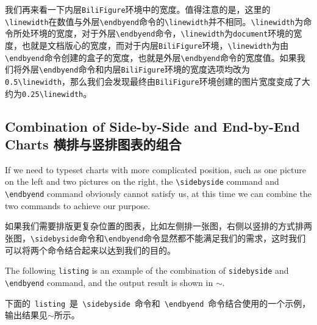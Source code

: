 \begin{ParaColumn}
    \switchcolumn

    我们再来看一下内层\verb"BiliFigure"环境中的宽度。值得注意的是，这里的\verb"\linewidth"在数值与外层\verb"\endbyend"命令的\verb"\linewidth"并不相同。\verb"\linewidth"为命令所处环境的宽度，对于外层\verb"\endbyend"命令，\verb"\linewidth"为\verb"document"环境的宽度，也就是文档版心的宽度，而对于内层\verb"BiliFigure"环境，\verb"\linewidth"为由\verb"\endbyend"命令创建的盒子的宽度，也就是外层\verb"\endbyend"命令的宽度值。如果我们将外层\verb"\endbyend"命令和内层\verb"BiliFigure"环境的宽度选项均改为\verb"0.5\linewidth"，那么我们会发现最终由\verb"BiliFigure"环境创建的图片宽度变成了大约为\verb"0.25\linewidth"。

\end{ParaColumn}

\subsection{Combination of Side-by-Side and End-by-End Charts 横排与竖排图表的组合}

\begin{ParaColumn}

    If we need to typeset charts with more complicated position, such as one picture on the left and two pictures on the right, the \verb"\sidebyside" command and \verb"\endbyend" command obviously cannot satisfy us, at this time we can combine the two commands to achieve our purpose.

    \switchcolumn

    如果我们需要排版更复杂位置的图表，比如左侧排一张图，右侧以竖排的方式排两张图，\verb"\sidebyside"命令和\verb"\endbyend"命令显然都不能满足我们的需求，这时我们可以将两个命令结合起来以达到我们的目的。

    \switchcolumn*

    The following \verb"listing" is an example of the combination of \verb"sidebyside" and \verb"\endbyend" command, and the output result is shown in $\sim$.

    \switchcolumn
    
    下面的~\verb"listing"~是~\verb"\sidebyside"~命令和~\verb"\endbyend"~命令结合使用的一个示例，输出结果见$\sim$所示。
    
\end{ParaColumn}

